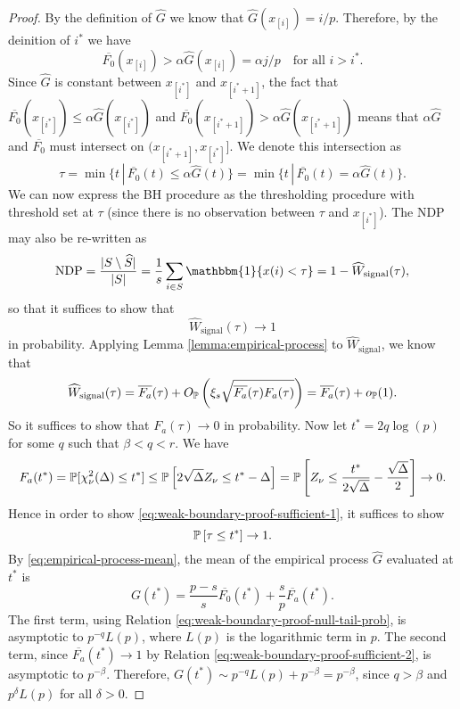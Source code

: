 \begin{proof}
By the definition of $\widehat{G}$ we know that $\widehat{G}(x_{[i]}) = i/p$.
Therefore, by the deinition of $i^*$ we have
\begin{equation}
    \overline{F_0}(x_{[i]}) > \alpha\widehat{G}(x_{[i]}) = \alpha j/p \quad \text{for all }i>i^*.
\end{equation}
Since $\widehat{G}$ is constant between $x_{[i^*]}$ and $x_{[i^*+1]}$, the fact that 
$\overline{F_0}(x_{[i^*]}) \le \alpha\widehat{G}(x_{[i^*]})$ and $\overline{F_0}(x_{[i^*+1]}) > \alpha\widehat{G}(x_{[i^*+1]})$ means that $\alpha\widehat{G}$ and $\overline{F_0}$ must intersect on $(x_{[i^*+1]}, x_{[i^*]}]$.
We denote this intersection as
\begin{equation} \label{eq:weak-boundary-proof-tau}
    \tau = \min\{t\,|\,\overline{F_0}(t)\le\alpha\widehat{G}(t)\} = \min\{t\,|\,\overline{F_0}(t)=\alpha\widehat{G}(t)\}.
\end{equation}
We can now express the BH procedure as the thresholding procedure with threshold set at $\tau$ (since there is no observation between $\tau$ and $x_{[i^*]}$).
The NDP may also be re-written as 
$$
\text{NDP} = \frac{|{S}\setminus\widehat{S}|}{|{S}|} = \frac{1}{s}\sum_{i\in S}\mathbbm{1}\{x(i) < \tau\} = 1 - \widehat{W}_\text{signal}(\tau),
$$
so that it suffices to show that 
\begin{equation} \label{eq:weak-boundary-proof-sufficient-1}
    \widehat{W}_\text{signal}(\tau)\to 1
\end{equation} in probability.
Applying Lemma \ref{lemma:empirical-process} to $\widehat{W}_\text{signal}$, we know that 
$$
\widehat{W}_\text{signal}(\tau) = \overline{F_a}(\tau) + O_\P\left(\xi_s\sqrt{\overline{F_a}(\tau)F_a(\tau)}\right) = \overline{F_a}(\tau) + o_\P(1).
$$
So it suffices to show that $F_a(\tau)\to 0$ in probability.
Now let $t^* = 2q\log(p)$ for some $q$ such that $\beta<q<r$.
We have 
\begin{equation} \label{eq:weak-boundary-proof-sufficient-2}
    F_a(t^*) = \P[\chi^2_\nu(\Delta) \le t^*]
    \le \P\left[2\sqrt{\Delta}Z_\nu \le t^* - \Delta\right] 
    = \P\left[Z_\nu \le \frac{t^*}{2\sqrt{\Delta}} - \frac{\sqrt{\Delta}}{2}\right] \to 0.
\end{equation}
Hence in order to show \eqref{eq:weak-boundary-proof-sufficient-1}, it suffices to show 
\begin{equation} \label{eq:weak-boundary-proof-sufficient-3}
    \P\left[\tau \le t^*\right] \to 1.
\end{equation}
By \eqref{eq:empirical-process-mean}, the mean of the empirical process $\widehat{G}$ evaluated at $t^*$ is
\begin{equation*}
    G(t^*) = \frac{p-s}{s}\overline{F_0}(t^*) + \frac{s}{p}\overline{F_a}(t^*).
\end{equation*}
The first term, using Relation \eqref{eq:weak-boundary-proof-null-tail-prob}, is asymptotic to $p^{-q}L(p)$, where $L(p)$ is the logarithmic term in $p$.
The second term, since $\overline{F_a}(t^*)\to 1$ by Relation \eqref{eq:weak-boundary-proof-sufficient-2}, is asymptotic to $p^{-\beta}$.
Therefore, $G(t^*) \sim p^{-q}L(p) + p^{-\beta} = p^{-\beta}$, since $q>\beta$ and $p^\delta L(p)$ for all $\delta>0$.


\end{proof}
